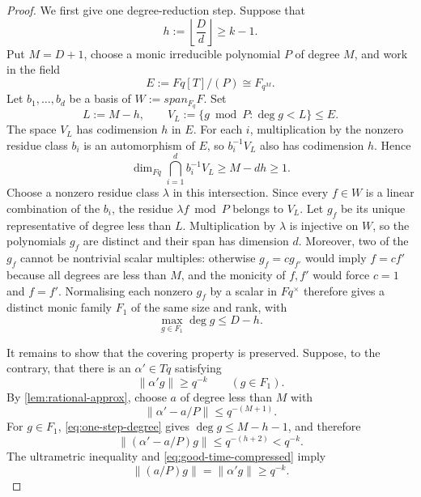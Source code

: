 \documentclass[11pt,reqno]{amsart}
\numberwithin{equation}{section}
\theoremstyle{definition}
\theoremstyle{remark}
\newcommand{\spanq}{\operatorname{span}_{\mathbb F_q}}
\newcommand{\Fq}{\mathbb F_q}
\newcommand{\Torus}{\mathbb T_q}
\newcommand{\cF}{\mathcal F}
\newcommand{\norm}[1]{\lVert#1\rVert}
\newcommand{\set}[1]{\{#1\}}
\def\Fq{Fq}%
\def\Torus{Tq}%
\def\mathbb#1{#1}%
\def\mathcal#1{#1}%
\def\operatorname#1{#1}%
\begin{document}
\begin{proof}
We first give one degree-reduction step.  Suppose that
\begin{equation}\label{eq:h-compression}
 h:=\left\lfloor\frac Dd\right\rfloor\ge k-1.
\end{equation}
Put $M=D+1$, choose a monic irreducible polynomial $P$ of degree $M$, and work in the field
\[
 E:=\Fq[T]/(P)\cong\mathbb F_{q^M}.
\]
Let $b_1,\ldots,b_d$ be a basis of
$W:=\spanq\cF$.  Set
\[
 L:=M-h,
 \qquad
 V_L:=\set{g\bmod P:\deg g<L}\le E.
\]
The space $V_L$ has codimension $h$ in $E$.  For each $i$, multiplication by the nonzero residue class $b_i$ is an automorphism of $E$, so
$b_i^{-1}V_L$ also has codimension $h$.  Hence
\begin{equation}\label{eq:compression-intersection}
 \dim_{\Fq}\bigcap_{i=1}^db_i^{-1}V_L
 \ge M-dh\ge1.
\end{equation}
Choose a nonzero residue class $\lambda$ in this intersection.  Since every $f\in W$ is a linear combination of the $b_i$, the residue
$\lambda f\bmod P$ belongs to $V_L$.  Let $g_f$ be its unique representative of degree less than $L$.  Multiplication by $\lambda$ is injective on $W$, so the polynomials $g_f$ are distinct and their span has dimension $d$.  Moreover, two of the $g_f$ cannot be nontrivial scalar multiples: otherwise $g_f=cg_{f'}$ would imply $f=cf'$ because all degrees are less than $M$, and the monicity of $f,f'$ would force $c=1$ and $f=f'$.  Normalising each nonzero $g_f$ by a scalar in $\Fq^\times$ therefore gives a distinct monic family $\cF_1$ of the same size and rank, with
\begin{equation}\label{eq:one-step-degree}
 \max_{g\in\cF_1}\deg g\le D-h.
\end{equation}

It remains to show that the covering property is preserved.  Suppose, to the contrary, that there is an
$\alpha'\in\Torus$ satisfying
\begin{equation}\label{eq:good-time-compressed}
 \norm{\alpha'g}\ge q^{-k}
 \qquad(g\in\cF_1).
\end{equation}
By \cref{lem:rational-approx}, choose $a$ of degree less than $M$ with
\[
 \norm{\alpha'-a/P}\le q^{-(M+1)}.
\]
For $g\in\cF_1$, \eqref{eq:one-step-degree} gives
$\deg g\le M-h-1$, and therefore
\[
 \norm{(\alpha'-a/P)g}
 \le q^{-(h+2)}<q^{-k}.
\]
The ultrametric inequality and \eqref{eq:good-time-compressed} imply
\begin{equation}\label{eq:rational-time-good}
 \norm{(a/P)g}=\norm{\alpha'g}\ge q^{-k}.
\end{equation}


\end{proof}
\end{document}
